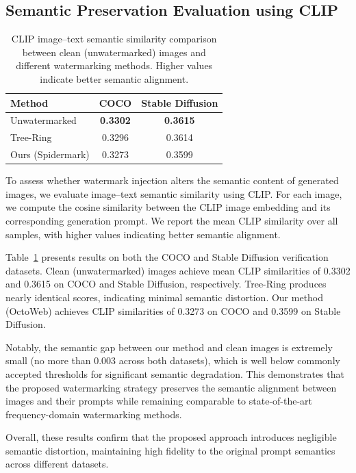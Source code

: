 \subsection{Semantic Preservation Evaluation using CLIP}

\begin{table}[t]
\centering
\caption{CLIP image--text semantic similarity comparison between clean (unwatermarked) images and different watermarking methods. Higher values indicate better semantic alignment.}
\label{tab:clip_similarity}
\begin{tabular}{lcc}
\toprule
\textbf{Method} & \textbf{COCO} & \textbf{Stable Diffusion} \\
\midrule
Unwatermarked & \textbf{0.3302} & \textbf{0.3615} \\
Tree-Ring             & 0.3296          & 0.3614          \\
Ours (Spidermark)        & 0.3273          & 0.3599          \\
\bottomrule
\end{tabular}
\end{table}


To assess whether watermark injection alters the semantic content of generated images, we evaluate image--text semantic similarity using CLIP. For each image, we compute the cosine similarity between the CLIP image embedding and its corresponding generation prompt. We report the mean CLIP similarity over all samples, with higher values indicating better semantic alignment.

Table~\ref{tab:clip_similarity} presents results on both the COCO and Stable Diffusion verification datasets. Clean (unwatermarked) images achieve mean CLIP similarities of 0.3302 and 0.3615 on COCO and Stable Diffusion, respectively. Tree-Ring produces nearly identical scores, indicating minimal semantic distortion. Our method (OctoWeb) achieves CLIP similarities of 0.3273 on COCO and 0.3599 on Stable Diffusion.

Notably, the semantic gap between our method and clean images is extremely small (no more than 0.003 across both datasets), which is well below commonly accepted thresholds for significant semantic degradation. This demonstrates that the proposed watermarking strategy preserves the semantic alignment between images and their prompts while remaining comparable to state-of-the-art frequency-domain watermarking methods.

Overall, these results confirm that the proposed approach introduces negligible semantic distortion, maintaining high fidelity to the original prompt semantics across different datasets.


